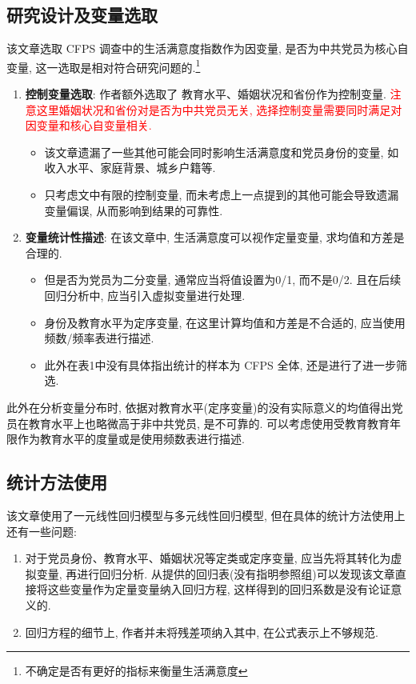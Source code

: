 \documentclass[11pt]{article}
\newcommand\1{\mathds{1}}
\begin{document}
\subsection{研究设计及变量选取}
    该文章选取 CFPS 调查中的生活满意度指数作为因变量, 是否为中共党员为核心自变量, 这一选取是相对符合研究问题的.\footnote{不确定是否有更好的指标来衡量生活满意度}
    \begin{enumerate}[label=(\arabic*)]
        \item \textbf{控制变量选取}: 作者额外选取了 教育水平、婚姻状况和省份作为控制变量. \textcolor{red}{注意这里婚姻状况和省份对是否为中共党员无关, 选择控制变量需要同时满足对因变量和核心自变量相关.}
        \begin{itemize}
            \item 该文章遗漏了一些其他可能会同时影响生活满意度和党员身份的变量, 如收入水平、家庭背景、城乡户籍等.
            \item 只考虑文中有限的控制变量, 而未考虑上一点提到的其他可能会导致遗漏变量偏误, 从而影响到结果的可靠性.
        \end{itemize}
        \item \textbf{变量统计性描述}: 在该文章中, 生活满意度可以视作定量变量, 求均值和方差是合理的.
        \begin{itemize}
            \item 但是否为党员为二分变量, 通常应当将值设置为0/1, 而不是0/2. 且在后续回归分析中, 应当引入虚拟变量进行处理.
            \item 身份及教育水平为定序变量, 在这里计算均值和方差是不合适的, 应当使用频数/频率表进行描述.
            \item 此外在表1中没有具体指出统计的样本为 CFPS 全体, 还是进行了进一步筛选.
        \end{itemize}
    \end{enumerate}
    此外在分析变量分布时, 依据对教育水平(定序变量)的没有实际意义的均值得出党员在教育水平上也略微高于非中共党员, 是不可靠的. 可以考虑使用受教育教育年限作为教育水平的度量或是使用频数表进行描述.
\subsection{统计方法使用}
    该文章使用了一元线性回归模型与多元线性回归模型, 但在具体的统计方法使用上还有一些问题:   
    \begin{enumerate}[label=(\arabic*)]
        \item 对于党员身份、教育水平、婚姻状况等定类或定序变量, 应当先将其转化为虚拟变量, 再进行回归分析. 从提供的回归表(没有指明参照组)可以发现该文章直接将这些变量作为定量变量纳入回归方程, 这样得到的回归系数是没有论证意义的.
        \item 回归方程的细节上, 作者并未将残差项纳入其中, 在公式表示上不够规范. 
    \end{enumerate}
\end{document}
